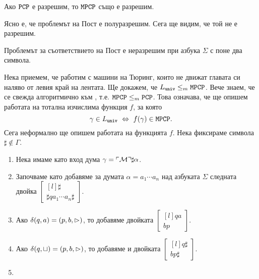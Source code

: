 \begin{corollary}
  Ако $\texttt{PCP}$ е разрешим, то $\texttt{MPCP}$ също е разрешим.
\end{corollary}

Ясно е, че проблемът на Пост е полуразрешим. Сега ще видим, че той не е разрешим.

\begin{framed}
  \begin{theorem}
    Проблемът за съответствието на Пост е неразрешим при азбука $\Sigma$ с поне два символа.
  \end{theorem}
\end{framed}
\begin{hint}
  Нека приемем, че работим с машини на Тюринг, които не движат главата си наляво от левия край на лентата.
  Ще докажем, че $L_{\texttt{univ}} \leq_m \texttt{MPCP}$. Вече знаем, че \MPCP се свежда алгоритмично към \PCP, т.е. $\texttt{MPCP} \leq_m \texttt{PCP}$.
  Това означава, че ще опишем работата на тотална изчислима функция $f$, за която
  \[\gamma \in L_{\texttt{univ}} \ \Leftrightarrow\  f(\gamma) \in \texttt{MPCP}.\]
  Сега неформално ще опишем работата на функцията $f$.
  Нека фиксираме символа $\sharp \not \in \Gamma$.
  \begin{enumerate}[1)]
  \item
    Нека имаме като вход дума $\gamma = \ulcorner{\mathcal{M}}\urcorner\sharp \alpha$.
  \item
    Започваме като добавяме за думата $\alpha = a_1\cdots a_n$ над азбуката $\Sigma$ следната двойка
    $\begin{bmatrix*}[l] \sharp\\ \sharp qa_1\cdots a_n\sharp\end{bmatrix*}$.
  \item
    Ако $\delta(q,a) = (p,b,\rhd)$, то добавяме двойката
    $\begin{bmatrix*}[l] qa\\ bp\end{bmatrix*}$.
  \item
    Ако $\delta(q,\sqcup) = (p,b,\rhd)$, то добавяме и двойката $\begin{bmatrix*}[l] q\sharp\\ bp\sharp\end{bmatrix*}$.
  \item

\end{enumerate}
\end{hint}
